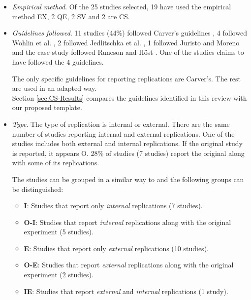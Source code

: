 \begin{itemize}
	\item \emph{Empirical method}. Of the 25 studies selected, 19 have used the empirical method \gls{EX}, 2 \gls{QE}, 2 \gls{SV} and 2 are \gls{CS}. \\
	
	\item \emph{Guidelines followed}. 11 studies (44\%) followed Carver's guidelines \cite{carver2010towards}, 4 followed Wohlin et al. 
	\cite{wohlin:experimentation}, 2 followed Jedlitschka et al. \cite{jedlitschka2008reporting}, 1 followed Juristo and Moreno \cite{juristo2013basics} and the case study followed Runeson and H{\"o}st \cite{runeson2009guidelines}. One of the studies claims to have followed the 4 guidelines.
	
	The only specific guidelines for reporting replications are Carver's. The rest are used in an adapted way.\\
	Section \ref{sec:CS-Results} compares the guidelines identified in this review with our proposed template. \\

	\item \emph{Type}. The type of replication is internal or external. There are the same number of studies reporting internal and external replications. One of the studies \cite{runeson2014variation} includes both external and internal replications. 
	If the original study is reported, it appears O. 28\% of studies (7 studies) report the original along with some of its replications.
	
	The studies can be grouped in a similar way to \cite{da2014replication} and the following groups can be distinguished:
	\begin{itemize}
        \item \textbf{I}: Studies that report only \emph{internal} replications (7 studies).
    
        \item \textbf{O-I}: Studies that report \emph{internal} replications along with the original experiment (5 studies).
    
        \item \textbf{E}: Studies that report only \emph{external} replications (10 studies).
    
        \item \textbf{O-E}: Studies that report \emph{external} replications along with the original experiment (2 studies).
    
        \item \textbf{IE}: Studies that report \emph{external} and \emph{internal} replications (1 study).
    	\\
    \end{itemize}	
    

\end{itemize}
